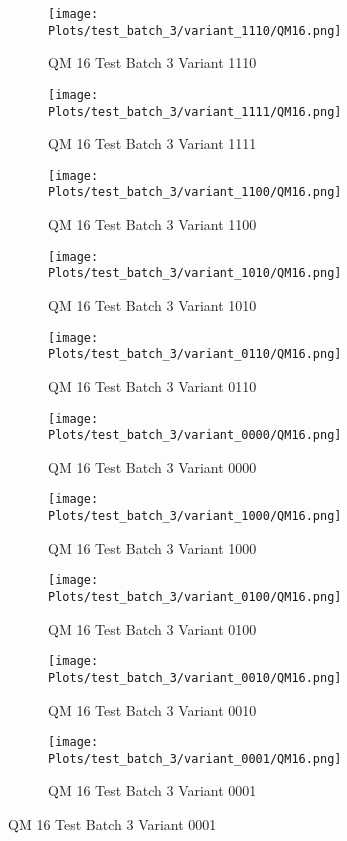 \documentclass{DissertateFigs}
\begin{document}
\begin{figure}[t!]
    \begin{subfigure}{0.33\textwidth}
    \texttt{[image: Plots/test\_batch\_3/variant\_1110/QM16.png]}
    \caption{QM 16 Test Batch 3 Variant 1110}
    \end{subfigure}
    \begin{subfigure}{0.33\textwidth}
    \texttt{[image: Plots/test\_batch\_3/variant\_1111/QM16.png]}
    \caption{QM 16 Test Batch 3 Variant 1111}
    \end{subfigure}

\medskip

    \begin{subfigure}{0.33\textwidth}
    \texttt{[image: Plots/test\_batch\_3/variant\_1100/QM16.png]}
    \caption{QM 16 Test Batch 3 Variant 1100}
    \end{subfigure}
    \begin{subfigure}{0.33\textwidth}
    \texttt{[image: Plots/test\_batch\_3/variant\_1010/QM16.png]}
    \caption{QM 16 Test Batch 3 Variant 1010}
    \end{subfigure}

\medskip

    \begin{subfigure}{0.33\textwidth}
    \texttt{[image: Plots/test\_batch\_3/variant\_0110/QM16.png]}
    \caption{QM 16 Test Batch 3 Variant 0110}
    \end{subfigure}
    \begin{subfigure}{0.33\textwidth}
    \texttt{[image: Plots/test\_batch\_3/variant\_0000/QM16.png]}
    \caption{QM 16 Test Batch 3 Variant 0000}
    \end{subfigure}

\medskip

    \begin{subfigure}{0.33\textwidth}
    \texttt{[image: Plots/test\_batch\_3/variant\_1000/QM16.png]}
    \caption{QM 16 Test Batch 3 Variant 1000}
    \end{subfigure}
    \begin{subfigure}{0.33\textwidth}
    \texttt{[image: Plots/test\_batch\_3/variant\_0100/QM16.png]}
    \caption{QM 16 Test Batch 3 Variant 0100}
    \end{subfigure}

\medskip

    \begin{subfigure}{0.33\textwidth}
    \texttt{[image: Plots/test\_batch\_3/variant\_0010/QM16.png]}
    \caption{QM 16 Test Batch 3 Variant 0010}
    \end{subfigure}
    \begin{subfigure}{0.33\textwidth}
    \texttt{[image: Plots/test\_batch\_3/variant\_0001/QM16.png]}
    \caption{QM 16 Test Batch 3 Variant 0001}
    \end{subfigure}


\end{figure}
\end{document}
